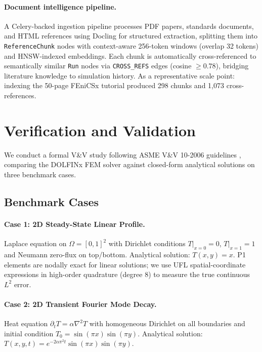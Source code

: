 \documentclass[twocolumn]{article}
\begin{document}
\paragraph{Document intelligence pipeline.}
A Celery-backed ingestion pipeline processes PDF papers, standards documents,
and HTML references using Docling \citep{docling2024} for structured
extraction, splitting them into \texttt{ReferenceChunk} nodes with
context-aware 256-token windows (overlap 32 tokens) and HNSW-indexed
embeddings.  Each chunk is automatically cross-referenced to semantically
similar \texttt{Run} nodes via \texttt{CROSS\_REFS} edges (cosine
$\ge 0.78$), bridging literature knowledge to simulation history.
As a representative scale point: indexing the 50-page FEniCSx tutorial
produced 298 chunks and 1{,}073 cross-references.

\section{Verification and Validation}
\label{sec:vv}

We conduct a formal V\&V study following ASME V\&V 10-2006 guidelines
\citep{asme2006vv}, comparing the DOLFINx FEM solver against closed-form
analytical solutions on three benchmark cases.

\subsection{Benchmark Cases}

\paragraph{Case 1: 2D Steady-State Linear Profile.}
Laplace equation on $\Omega = [0,1]^2$ with Dirichlet conditions
$T|_{x=0} = 0$, $T|_{x=1} = 1$ and Neumann zero-flux on top/bottom.
Analytical solution: $T(x,y) = x$.  P1 elements are nodally exact for
linear solutions; we use UFL spatial-coordinate expressions in high-order
quadrature (degree 8) to measure the true continuous $L^2$ error.

\paragraph{Case 2: 2D Transient Fourier Mode Decay.}
Heat equation $\partial_t T = \alpha \nabla^2 T$ with homogeneous Dirichlet
on all boundaries and initial condition $T_0 = \sin(\pi x)\sin(\pi y)$.
Analytical solution: $T(x,y,t) = e^{-2\alpha\pi^2 t}\sin(\pi x)\sin(\pi y)$.
\end{document}
